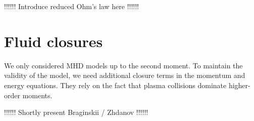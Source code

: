 !!!!!! 
Introduce reduced Ohm's law here 
!!!!!!


\section{Fluid closures}
\label{sec:desc_fluidClosures}

We only considered MHD models up to the second moment. To maintain the validity of the model, we need additional closure terms in the momentum and energy equations. They rely on the fact that plasma collisions dominate higher-order moments. 


!!!!!!
Shortly present Braginskii / Zhdanov
!!!!!!
